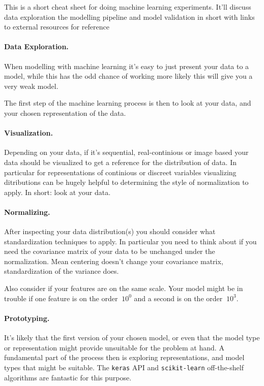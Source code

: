 \documentclass[%
oneside,                 %
final,                   %
10pt]{article}
\begin{document}
This is a short cheat sheet for doing machine learning
experiments. It'll discuss data exploration the modelling pipeline and
model validation in short with links to external resources for
reference

\paragraph{Data Exploration.}
When modelling with machine learning it's easy to just present your
data to a model, while this has the odd chance of working more likely
this will give you a very weak model.

The first step of the machine learning process is then to look at your
data, and your chosen representation of the data.

\paragraph{Visualization.}
Depending on your data, if it's sequential, real-continious or image
based your data should be visualized to get a reference for the
distribution of data. In particular for representations of continious
or discreet variables visualizing ditributions can be hugely helpful
to determining the style of normalization to apply. In short: look at
your data.

\paragraph{Normalizing.}
After inspecting your data distribution(s) you should consider what
standardization techniques to apply. In particular you need to think
about if you need the covariance matrix of your data to be unchanged
under the normalization. Mean centering doesn't change your covariance
matrix, standardization of the variance does.

Also consider if your features are on the same scale. Your model might
be in trouble if one feature is on the order $~10^0$ and a second is
on the order $~10^3$.

\paragraph{Prototyping.}
It's likely that the first version of your chosen model, or even that
the model type or representation might provide unsuitable for the
problem at hand. A fundamental part of the process then is exploring
representations, and model types that might be suitable. The \texttt{keras}
API and \texttt{scikit-learn} off-the-shelf algorithms are fantastic for this
purpose.
\end{document}

